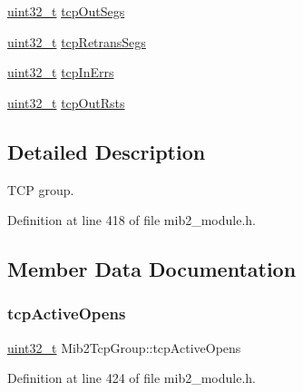 \begin{DoxyCompactItemize}
\item 
\hyperlink{stdint_8h_a435d1572bf3f880d55459d9805097f62}{uint32\+\_\+t} \hyperlink{structMib2TcpGroup_a80f4657724541a4894df8b81a1c9d33e}{tcp\+Out\+Segs}
\item 
\hyperlink{stdint_8h_a435d1572bf3f880d55459d9805097f62}{uint32\+\_\+t} \hyperlink{structMib2TcpGroup_a862d757b0b77851d5d9a2f5bccf2cdb4}{tcp\+Retrans\+Segs}
\item 
\hyperlink{stdint_8h_a435d1572bf3f880d55459d9805097f62}{uint32\+\_\+t} \hyperlink{structMib2TcpGroup_a1183c385b2f410a98fe4fbca8aa3fd3a}{tcp\+In\+Errs}
\item 
\hyperlink{stdint_8h_a435d1572bf3f880d55459d9805097f62}{uint32\+\_\+t} \hyperlink{structMib2TcpGroup_ac971c4bd4e6fbfc1e761f5c0f7ec8d7c}{tcp\+Out\+Rsts}
\end{DoxyCompactItemize}


\subsection{Detailed Description}
T\+CP group. 

Definition at line 418 of file mib2\+\_\+module.\+h.



\subsection{Member Data Documentation}
\mbox{\label{structMib2TcpGroup_a0497d623d5b6e74aea51b39cf4d2d995}} 
\subsubsection{\texorpdfstring{tcp\+Active\+Opens}{tcpActiveOpens}}
{\footnotesize\ttfamily \hyperlink{stdint_8h_a435d1572bf3f880d55459d9805097f62}{uint32\+\_\+t} Mib2\+Tcp\+Group\+::tcp\+Active\+Opens}



Definition at line 424 of file mib2\+\_\+module.\+h.

\mbox{\label{structMib2TcpGroup_a7b805df77f0d079b29e91337d7effef0}} 
